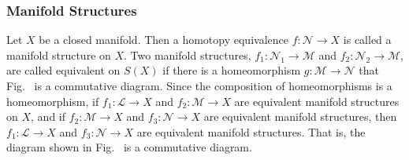 \documentclass[crop=false,class=book,oneside]{standalone}                      %
\begin{document}
        \subsubsection{Manifold Structures}
            Let $X$ be a closed manifold. Then a homotopy
            equivalence $f:\mathcal{N}\rightarrow{X}$ is called a
            manifold structure on $X$. Two manifold structures,
            $f_{1}:\mathcal{N}_{1}\rightarrow{\mathcal{M}}$ and
            $f_{2}:\mathcal{N}_{2}\rightarrow{\mathcal{M}}$, are called
            equivalent on $S(X)$ if there is a homeomorphism
            $g:\mathcal{M}\rightarrow\mathcal{N}$ that
            Fig.~ is a
            commutative diagram. Since the composition of homeomorphisms
            is a homeomorphism, if $f_{1}:\mathcal{L}\rightarrow{X}$ and
            $f_{2}:\mathcal{M}\rightarrow{X}$ are equivalent manifold structures
            on $X$, and if $f_{2}:\mathcal{M}\rightarrow{X}$
            and $f_{3}:\mathcal{N}\rightarrow{X}$ are equivalent
            manifold structures, then $f_{1}:\mathcal{L}\rightarrow{X}$
            and $f_{3}:\mathcal{N}\rightarrow{X}$ are equivalent manifold
            structures. That is, the diagram shown in
            Fig.~
            is a commutative diagram.
            \begin{figure}[H]
                \captionsetup{type=figure}
                \begin{subfigure}[b]{0.49\textwidth}
                    \centering
                    \captionsetup{type=figure}
                    
                    \label{fig:Equivalent_Manifold_Structure_Diagram}
                \end{subfigure}
                \begin{subfigure}[b]{0.49\textwidth}
                    \centering
                    \captionsetup{type=figure}
                    
                    \label{fig:Equivalent_Manifold_Structure_%
                           Diagram_Equivalence_Relation}
                \end{subfigure}
                \label{Commutative Diagrams for Manifold Structures.}
                \label{fig:Commutative_Diagrams_for_Manifold_Structures}
            \end{figure}
\end{document}

